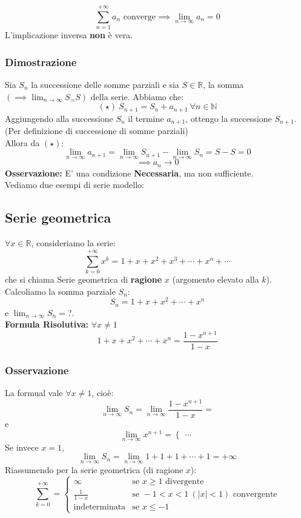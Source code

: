 \documentclass[../main.tex]{subfiles}
\begin{document}
\[
    \sum_{n=1}^{+\infty}a_n \text{ converge} \implies \lim_{n\to\infty}a_n = 0
\]
L'implicazione inversa \textbf{non} è vera.

\subsubsection{Dimostrazione}

Sia $S_n$ la successione delle somme parziali e sia $S\in \mathbb{R}$, la somma
$(\implies \lim_{n\to\infty}S_ = S)$ della serie. Abbiamo che:
\[
    (\star) \ S_{n+1} = S_n + a_{n+1} \ \forall n\in\mathbb{N}
\]
Aggiungendo alla successione $S_n$ il termine $a_{n+1}$, ottengo la successione
$S_{n+1}$. (Per definizione di successione di somme parziali)\\ Allora da
$(\star)$:
\[
    \lim_{n\to\infty}a_{n+1} = \lim_{n\to\infty}S_{n+1} - \lim_{n\to\infty}S_n = S - S = 0
\]
\[
    \implies a_n\to 0
\]
\textbf{Osservazione:}
E' una condizione \textbf{Necessaria}, ma non sufficiente.\\
Vediamo due esempi di serie modello:

\subsection{Serie geometrica}
$\forall x\in \mathbb{R}$, consideriamo la serie:
\[
    \sum_{k=0}^{+\infty} x^k = 1+ x + x^2 + x^3 + \cdots + x^n + \cdots
\]
che si chiama Serie geometrica di \textbf{ragione} $x$ (argomento elevato alla
$k$).\\ Calcoliamo la somma parziale $S_n$:
\[
    S_n = 1 + x + x^2 + \cdots + x^n
\]
e $\lim_{n\to\infty} S_n =$?.\\ \vspace{1pt} \textbf{Formula Risolutiva:}
$\forall x \ne 1$ \[
    1+x+x^2+\cdots+x^n = \frac{1-x^{n+1}}{1-x}
\]

\subsubsection{Osservazione}
La formual vale $\forall x \ne 1$, cioè:
\[
    \lim_{n\to\infty}S_n = \lim_{n\to\infty}\frac{1-x^{n+1}}{1-x} =
\]
e
\[
    \lim_{n\to\infty}x^{n+1} = \begin{cases}

        \dots
    \end{cases}
\]
Se invece $x = 1$,
\[
    \lim_{n\to\infty}S_n = \lim_{n\to\infty}1+1+1+\cdots+1 = +\infty
\]
Riassumendo per la serie geometrica (di ragione $x$):
\[
    \sum_{k=0}^{+\infty} = \begin{cases}
        \infty               & \text{se } x \geq 1 \text{ divergente}             \\
        \frac{1}{1-x}        & \text{se } -1 < x < 1\ (|x|<1) \text{ convergente} \\
        \text{indeterminata} & \text{se } x \leq -1
    \end{cases}
\]
\end{document}
